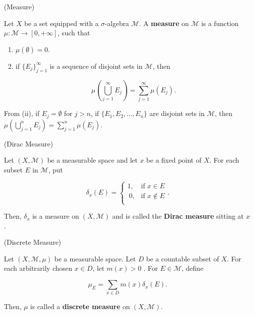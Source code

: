 \begin{definition}{(Measure) \cite{folland2013real}}

Let $X$ be a set equipped with a $\sigma$-algebra $\mathcal{M}$. A \textbf{measure} on $\mathcal{M}$ is a function $\mu : \mathcal{M} \rightarrow [0, + \infty]$, such that

\begin{enumerate}[label=(\roman*)]
    \item $\mu(\emptyset) = 0$.
    \item if $\{E_{j}\}_{j = 1}^{\infty}$ is a sequence of disjoint sets in $\mathcal{M}$, then
    
    \[ \mu \left( \bigcup_{j = 1}^{\infty} E_{j} \right) = \sum_{j = 1}^{\infty} \mu(E_{j}). \]

\end{enumerate}

\noindent From (ii), if $E_{j} = \emptyset$ for $j > n$, if $\{E_{1},E_{2},...,E_{n}\}$ are disjoint sets in $\mathcal{M}$, then $\mu \left( \bigcup_{j = 1}^{n} E_{j} \right) = \sum_{j = 1}^{n} \mu(E_{j})$.

\end{definition}
\vspace{0.1in}

\begin{definition}{(Dirac Measure) \cite{ccinlar2011probability}}

Let $(X,\mathcal{M})$ be a measurable space and let $x$ be a fixed point of $X$. For each subset $E$ in $\mathcal{M}$, put

    \[ 
        \delta_{x}(E) = \left\{
        \begin{array}{lr}
            1, & \text{if } x \in E\\\
            0, & \text{if } x \notin E\\
        \end{array}
        \right..
    \]

\noindent Then, $\delta_{x}$ is a measure on $(X,\mathcal{M})$ and is called the \textbf{Dirac measure} sitting at $x$.

\end{definition}
\vspace{0.1in}

\begin{definition}{(Discrete Measure) \cite{ccinlar2011probability}}

Let $(X,\mathcal{M},\mu)$ be a measurable space. Let $D$ be a countable subset of $X$. For each arbitrarily chosen $x \in D$, let $m(x) > 0$ . For $E \in \mathcal{M}$, define

    \[ \mu_{E} =  \sum_{x \in D}m(x)\delta_{x}(E). \]

\noindent Then, $\mu$ is called a \textbf{discrete measure} on $(X,\mathcal{M})$.

\end{definition}
\vspace{0.1in}

